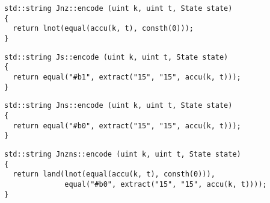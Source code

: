 
\begin{lstlisting}[style=c++, style=encode]
std::string Jnz::encode (uint k, uint t, State state)
{
  return lnot(equal(accu(k, t), consth(0)));
}
\end{lstlisting}


\begin{lstlisting}[style=c++, style=encode]
std::string Js::encode (uint k, uint t, State state)
{
  return equal("#b1", extract("15", "15", accu(k, t)));
}
\end{lstlisting}


\newpage

\begin{lstlisting}[style=c++, style=encode]
std::string Jns::encode (uint k, uint t, State state)
{
  return equal("#b0", extract("15", "15", accu(k, t)));
}
\end{lstlisting}


\begin{lstlisting}[style=c++, style=encode]
std::string Jnzns::encode (uint k, uint t, State state)
{
  return land(lnot(equal(accu(k, t), consth(0))),
              equal("#b0", extract("15", "15", accu(k, t))));
}
\end{lstlisting}

